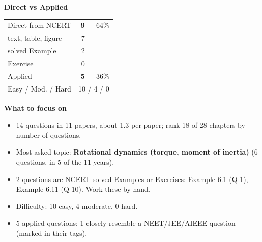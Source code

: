 \begin{minipage}[t]{0.34\linewidth}{\small\textbf{\color{crimson}Direct vs Applied}\par\smallskip
\begin{tabular}{@{}lrr@{}}\toprule
Direct from NCERT & \textbf{9} & 64\%\\
\quad text, table, figure & 7 &\\
\quad solved Example & 2 &\\
\quad Exercise & 0 &\\
Applied & \textbf{5} & 36\%\\\midrule
Easy / Mod. / Hard & \multicolumn{2}{r}{10 / 4 / 0}\\\bottomrule
\end{tabular}}\end{minipage}\hfill
\begin{minipage}[t]{0.63\linewidth}{\small\textbf{\color{crimson}What to focus on}\par\smallskip
\begin{itemize}[leftmargin=1.1em,itemsep=1pt,topsep=0pt]
\item 14 questions in 11 papers, about 1.3 per paper; rank 18 of 28 chapters by number of questions.
\item Most asked topic: \textbf{Rotational dynamics (torque, moment of inertia)} (6 questions, in 5 of the 11 years).
\item 2 questions are NCERT solved Examples or Exercises: Example 6.1 (Q 1), Example 6.11 (Q 10). Work these by hand.
\item Difficulty: 10 easy, 4 moderate, 0 hard.
\item 5 applied questions; 1 closely resemble a NEET/JEE/AIEEE question (marked in their tags).
\end{itemize}}\end{minipage}\par
{}
